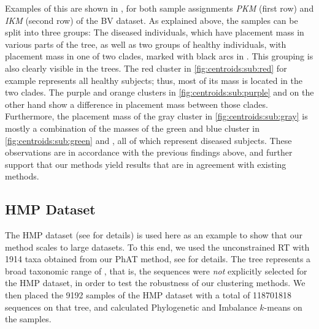 Examples of this are shown in ,
for both sample assignments \emph{PKM} (first row) and \emph{IKM} (second row) of the \ac{BV} dataset.
As explained above, the samples can be split into three groups:
The diseased individuals, which have placement mass in various parts of the tree,
as well as two groups of healthy individuals, with placement mass in one of two  clades,
marked with black arcs in .
This grouping is also clearly visible in the trees.
The red cluster in \ref{fig:centroids:sub:red} for example represents all healthy subjects;
thus, most of its mass is located in the two  clades.
The purple and orange clusters in \ref{fig:centroids:sub:purple} and 
on the other hand show a difference in placement mass between those clades.
Furthermore, the placement mass of the gray cluster in \ref{fig:centroids:sub:gray} is mostly
a combination of the masses of the green and blue cluster in \ref{fig:centroids:sub:green} and ,
all of which represent diseased subjects.
These observations are in accordance with the previous findings above,
and further support that our methods yield results that are in agreement with existing methods.


\subsection{HMP Dataset}
\label{ch:Clustering:sec:Results:sub:HMPDataset}

The \acf{HMP} dataset \cite{Huttenhower2012,Methe2012} (see  for details)
is used here as an example to show that our method scales to large datasets.
To this end, we used the unconstrained  \ac{RT} with \num{1 914} taxa
obtained from our \ac{PhAT} method, see  for details.
The tree represents a broad taxonomic range of ,
that is, the sequences were \emph{not} explicitly selected for the \ac{HMP} dataset,
in order to test the robustness of our clustering methods.
We then placed the \num{9 192} samples of the \ac{HMP} dataset with a total of \num{118 701 818} sequences on that tree,
and calculated Phylogenetic and Imbalance $k$-means on the samples.

